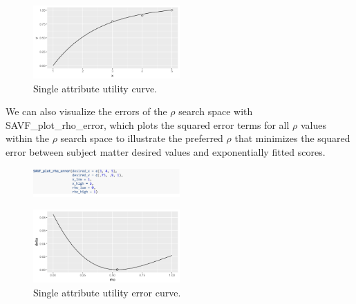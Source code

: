 \documentclass[twocolumn]{svjour3}       %
\begin{document}
\begin{figure}[!htb]
  \includegraphics[width=0.5\textwidth]{fig3.png}
  \caption{Single attribute utility curve.}
  \label{fig:3}
\end{figure}

We can also visualize the errors of the $\rho$ search space with SAVF\_plot\_rho\_error, which plots the squared error terms for all $\rho$ values within the $\rho$ search space to illustrate the preferred $\rho$ that minimizes the squared error between subject matter desired values and exponentially fitted scores.
\begin{figure}[!htb]
  \includegraphics[width=0.5\textwidth]{code7.png}
\end{figure}

\begin{figure}[H]%
  \includegraphics[width=0.5\textwidth]{fig4.png}
  \caption{Single attribute utility error curve.}
  \label{fig:4}
\end{figure}
\end{document}

